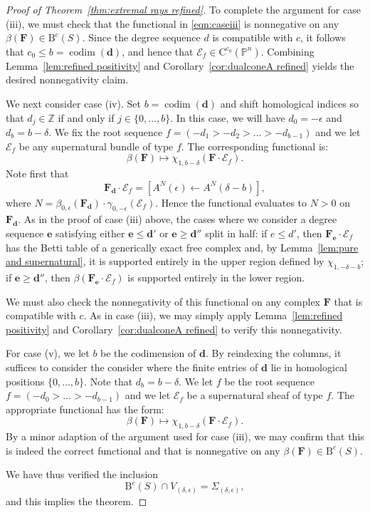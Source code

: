 \documentclass[12pt]{amsart}
\theoremstyle{definition}
\theoremstyle{remark}
\newcommand{\codim}{\operatorname{codim}}
\newcommand{\PP}{\mathbb{P}}
\newcommand{\ZZ}{\mathbb{Z}}
\newcommand{\cc}{c}
\newcommand{\dd}{\mathbf{d}}
\newcommand{\ee}{\mathbf{e}}
\newcommand{\cE}{\mathcal{E}}
\newcommand{\FF}{\mathbf{F}}
\newcommand{\CQ}{\mathrm{C}}
\newcommand{\BBQ}{\mathrm{B}}
\begin{document}
\begin{proof}[Proof of Theorem~\ref{thm:extremal rays refined}]
To complete the argument for case (iii), we must check that the functional in \eqref{eqn:caseiii}  is nonnegative on any $\beta(\FF)\in \BBQ^{\cc}(S)$.  Since the degree sequence $d$ is compatible with $\cc$, it follows that $c_0\leq b=\codim(\dd)$, and hence that $\cE_f\in \CQ^{c_0}(\PP^n)$.  Combining Lemma~\ref{lem:refined positivity} and Corollary~\ref{cor:dualconeA refined} yields the desired nonnegativity claim.

We next consider case (iv).  Set $b=\codim(\dd)$ and shift homological indices so that $d_j\in \ZZ$ if and only if $j\in \{0, \dots, b\}$.  In this case, we will have $d_0=-\epsilon$ and $d_b=b-\delta$.  We fix the root sequence $f=(-d_{1}>-d_{2}>\dots>-d_{b-1})$ and we let $\cE_f$ be any supernatural bundle of type $f$.   The corresponding functional is:
\[
\beta(\FF)\mapsto \chi_{1,b-\delta}(\FF\cdot \cE_f).
\]
Note first that
\[
\FF_{\dd}\cdot \cE_f=\left[{A^N}(\epsilon)\gets A^N(\delta-b) \right],
\]
where $N=\beta_{0,\epsilon}(\FF_{\dd})\cdot \gamma_{0,-\epsilon}(\cE_f)$.  Hence the functional evaluates to $N>0$ on $\FF_{\dd}$.  
As in the proof of case (iii) above, the cases where we consider a degree sequence $\ee$ satisfying either $\ee\leq \dd'$  or $\ee\geq \dd''$ split in half:
if $e\leq d'$, then $\FF_{\ee}\cdot \cE_f$ has the Betti table of a generically exact free complex and, by Lemma~\ref{lem:pure and supernatural}, it is supported entirely in the upper region defined by $\chi_{1,-\delta-b}$; if $\ee\geq \dd''$, then $\beta(\FF_{\ee}\cdot \cE_f)$ is supported entirely in the lower region.  

We must also check the nonnegativity of this functional on any complex $\FF$ that is compatible with $\cc$.   As in case (iii), we may simply apply Lemma~\ref{lem:refined positivity} and Corollary~\ref{cor:dualconeA refined} to verify this nonnegativity.

For case (v), we let $b$ be the codimension of $\dd$.  By reindexing the columns, it suffices to consider the consider where the finite entries of $\dd$ lie in homological positions $\{0,\dots,b\}$.  Note that $d_{b}=b-\delta$.  We let $f$ be the root sequence $f=(-d_0>\dots >-d_{b-1})$ and we let $\cE_f$ be a supernatural sheaf of type $f$.  The appropriate functional has the form:
\[
\beta(\FF)\mapsto \chi_{1,b-\delta}(\FF\cdot \cE_f).
\]
By a minor adaption of the argument used for case (iii), we may confirm that this is indeed the correct functional and that is nonnegative on any $\beta(\FF)\in \BBQ^{\cc}(S)$.

We have thus verified the inclusion
\[
\BBQ^{\cc}(S)\cap V_{(\delta,\epsilon)}=\Sigma_{(\delta,\epsilon)},
\]
and this implies the theorem.
\end{proof}
\end{document}
